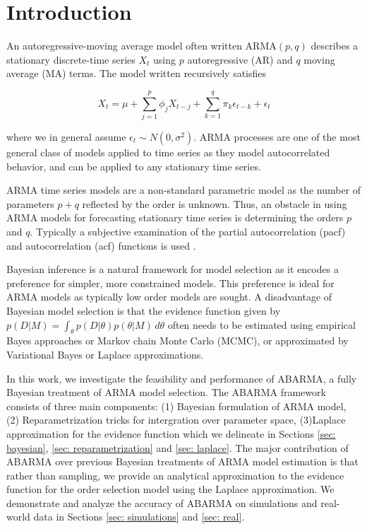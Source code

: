 \section{Introduction}
An autoregressive-moving average model often written ARMA$(p,q)$ describes a stationary discrete-time series $X_t$ using $p$ autoregressive (AR) and $q$ moving average (MA) terms.  The model written recursively satisfies 

\begin{equation*}
\label{arma}
    X_t = \mu + \sum_{j=1}^{p} \phi_{j}X_{t-j} + \sum_{k=1}^{q} \pi_{k}\epsilon_{t-k}+\epsilon_t 
\end{equation*}

where we in general assume $\epsilon_t\sim N(0,\sigma^2)$.  ARMA processes are one of the most general class of models applied to time series  as they model autocorrelated behavior, and can be applied to any stationary time series.

ARMA time series models are a non-standard parametric model as the number of parameters $p + q$ reflected by the order is unknown.  Thus, an obstacle in using ARMA models for forecasting stationary time series is determining the orders $p$ and $q$.  Typically a subjective examination of the partial autocorrelation (pacf) and autocorrelation (acf) functions is used \cite{hyndman2008}.  

Bayesian inference is a natural framework for model selection as it encodes a preference for simpler, more constrained models.  This preference is ideal for ARMA models as typically low order models are sought.  A disadvantage of Bayesian model selection is that the evidence function given by $p(D|M) = \int_{\theta} p(D|\theta)p(\theta|M)\, d\theta$ often needs to be estimated using empirical Bayes approaches or Markov chain Monte Carlo (MCMC), or approximated by Variational Bayes or Laplace approximations.  

In this work, we investigate the feasibility and performance of ABARMA, a fully Bayesian treatment of ARMA model selection.  The ABARMA framework consists of three main components: (1) Bayesian formulation of ARMA model, (2) Reparametrization tricks for intergration over parameter space, (3)Laplace approximation for the evidence function which we delineate in Sections \ref{sec: bayesian}, \ref{sec: reparametrization} and \ref{sec: laplace}. The major contribution of ABARMA over previous Bayesian treatments of ARMA model estimation is that rather than sampling, we provide an analytical approximation to the evidence function for the order selection model using the Laplace approximation. We demonstrate and analyze the accuracy of ABARMA on simulations and real-world data in Sections \ref{sec: simulations} and \ref{sec: real}.


